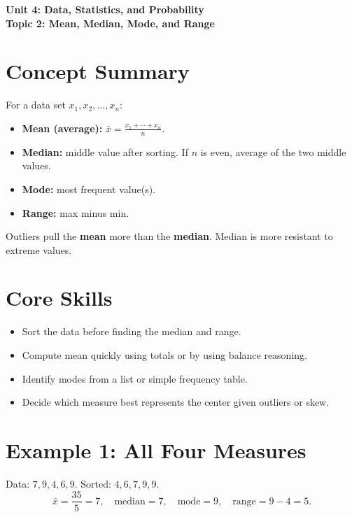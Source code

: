 \documentclass[12pt]{article}
\begin{document}
\begin{center}
    \LARGE \textbf{Unit 4: Data, Statistics, and Probability} \\[6pt]
    \Large \textbf{Topic 2: Mean, Median, Mode, and Range}
\end{center}

\vspace{1em}

\section*{Concept Summary}

For a data set \(x_1,x_2,\dots,x_n\):
\begin{itemize}
  \item \textbf{Mean (average):} \(\displaystyle \bar{x}=\frac{x_1+\cdots+x_n}{n}\).
  \item \textbf{Median:} middle value after sorting. If \(n\) is even, average of the two middle values.
  \item \textbf{Mode:} most frequent value(s).
  \item \textbf{Range:} max minus min.
\end{itemize}

Outliers pull the \textbf{mean} more than the \textbf{median}. Median is more resistant to extreme values.

\section*{Core Skills}
\begin{itemize}
  \item Sort the data before finding the median and range.
  \item Compute mean quickly using totals or by using balance reasoning.
  \item Identify modes from a list or simple frequency table.
  \item Decide which measure best represents the center given outliers or skew.
\end{itemize}

\section*{Example 1: All Four Measures}

Data: \(7, 9, 4, 6, 9\). Sorted: \(4,6,7,9,9\).
\[
\bar{x}=\frac{35}{5}=7,\quad \text{median}=7,\quad \text{mode}=9,\quad \text{range}=9-4=5.
\]
\end{document}
